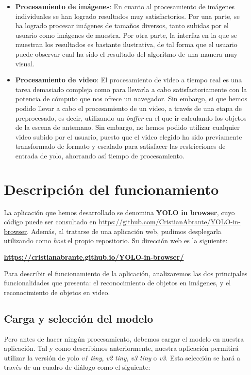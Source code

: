 \documentclass[a4paper]{article}
\begin{document}
\begin{itemize}
    \item \textbf{Procesamiento de imágenes}: En cuanto al procesamiento de imágenes individuales se 
    han logrado resultados muy satisfactorios. Por una parte, se ha logrado procesar imágenes de 
    tamaños diversos, tanto subidas por el usuario como imágenes de muestra. Por otra parte, la 
    interfaz en la que se muestran los resultados es bastante ilustrativa, de tal forma que el usuario
    puede observar cual ha sido el resultado del algoritmo de una manera muy visual.
    \item \textbf{Procesamiento de video}:  El procesamiento de video a tiempo real es una tarea 
    demasiado compleja como para llevarla a cabo satisfactoriamente con la potencia de cómputo que nos
    ofrece un navegador. Sin embargo, si que hemos podido llevar a cabo el procesamiento de un video, a través de una etapa de preprocesado, es decir, utilizando un \textit{buffer} en el que ir 
    calculando los objetos de la escena de antemano. Sin embargo, no hemos podido utilizar cualquier 
    video subido por el usuario, puesto que el video elegido ha sido previamente transformado de 
    formato y escalado para satisfacer las restricciones de entrada de yolo, ahorrando así tiempo de 
    procesamiento.
\end{itemize}

\section{Descripción del funcionamiento}
La aplicación que hemos desarrollado se denomina \textbf{YOLO in browser},  cuyo código puede ser 
consultado en \url{https://github.com/CristianAbrante/YOLO-in-browser}. Además, al tratarse de una 
aplicación web, pudimos desplegarla utilizando como \textit{host} el propio repositorio. Su 
dirección web es la siguiente:

\begin{center}
    \textbf{\url{https://cristianabrante.github.io/YOLO-in-browser/}} \\
\end{center}

Para describir el funcionamiento de la aplicación, analizaremos las dos principales funcionalidades
que presenta: el reconocimiento de objetos en imágenes, y el reconocimiento de objetos en video. \\

\subsection{Carga y selección del modelo}
Pero antes de hacer ningún procesamiento, debemos cargar el modelo en nuestra aplicación. Tal y como 
describimos anteriormente, nuestra aplicación permitirá 
utilizar la versión de yolo \textit{v1 tiny}, \textit{v2 tiny}, \textit{v3 tiny} o \textit{v3}. Esta
selección se hará a través de un cuadro de diálogo como el siguiente: \\
\end{document}
